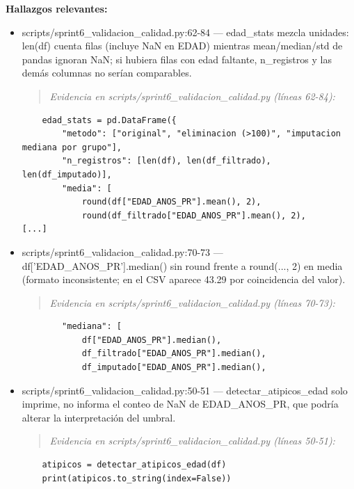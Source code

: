 \textbf{Hallazgos relevantes:}
\begin{itemize}
  \item scripts/sprint6\_validacion\_calidad.py:62-84 --- edad\_stats mezcla unidades: len(df) cuenta filas (incluye NaN en EDAD) mientras mean/median/std de pandas ignoran NaN; si hubiera filas con edad faltante, n\_registros y las demás columnas no serían comparables.
\begin{quote}\footnotesize\ttfamily
\noindent\emph{Evidencia en scripts/sprint6\_validacion\_calidad.py (líneas 62-84):}
\end{quote}
\begin{lstlisting}
    edad_stats = pd.DataFrame({
        "metodo": ["original", "eliminacion (>100)", "imputacion mediana por grupo"],
        "n_registros": [len(df), len(df_filtrado), len(df_imputado)],
        "media": [
            round(df["EDAD_ANOS_PR"].mean(), 2),
            round(df_filtrado["EDAD_ANOS_PR"].mean(), 2),
[...]
\end{lstlisting}

  \item scripts/sprint6\_validacion\_calidad.py:70-73 --- df['EDAD\_ANOS\_PR'].median() sin round frente a round(..., 2) en media (formato inconsistente; en el CSV aparece 43.29 por coincidencia del valor).
\begin{quote}\footnotesize\ttfamily
\noindent\emph{Evidencia en scripts/sprint6\_validacion\_calidad.py (líneas 70-73):}
\end{quote}
\begin{lstlisting}
        "mediana": [
            df["EDAD_ANOS_PR"].median(),
            df_filtrado["EDAD_ANOS_PR"].median(),
            df_imputado["EDAD_ANOS_PR"].median(),
\end{lstlisting}

  \item scripts/sprint6\_validacion\_calidad.py:50-51 --- detectar\_atipicos\_edad solo imprime, no informa el conteo de NaN de EDAD\_ANOS\_PR, que podría alterar la interpretación del umbral.
\begin{quote}\footnotesize\ttfamily
\noindent\emph{Evidencia en scripts/sprint6\_validacion\_calidad.py (líneas 50-51):}
\end{quote}
\begin{lstlisting}
    atipicos = detectar_atipicos_edad(df)
    print(atipicos.to_string(index=False))
\end{lstlisting}

\end{itemize}

